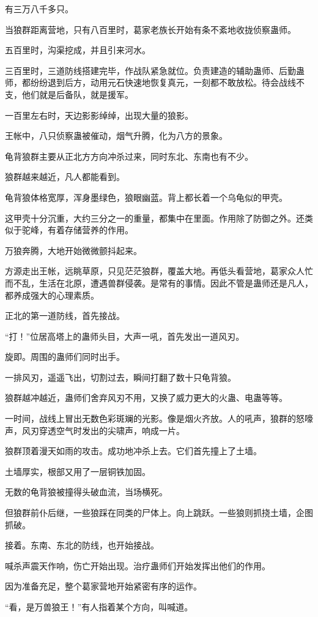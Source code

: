 \begin{this_body}
有三万八千多只。

当狼群距离营地，只有八百里时，葛家老族长开始有条不紊地收拢侦察蛊师。

五百里时，沟渠挖成，并且引来河水。

三百里时，三道防线搭建完毕，作战队紧急就位。负责建造的辅助蛊师、后勤蛊师，都纷纷退到后方，动用元石快速地恢复真元，一刻都不敢放松。待会战线不支，他们就是后备队，就是援军。

一百里左右时，天边影影绰绰，出现大量的狼影。

王帐中，八只侦察蛊被催动，烟气升腾，化为八方的景象。

龟背狼群主要从正北方方向冲杀过来，同时东北、东南也有不少。

狼群越来越近，凡人都能看到。

龟背狼体格宽厚，浑身墨绿色，狼眼幽蓝。背上都长着一个乌龟似的甲壳。

这甲壳十分沉重，大约三分之一的重量，都集中在里面。作用除了防御之外。还类似于驼峰，有着存储营养的作用。

万狼奔腾，大地开始微微颤抖起来。

方源走出王帐，远眺草原，只见茫茫狼群，覆盖大地。再低头看营地，葛家众人忙而不乱，生活在北原，遭遇兽群侵袭。是常有的事情。因此不管是蛊师还是凡人，都养成强大的心理素质。

正北的第一道防线，首先接战。

“打！”位居高塔上的蛊师头目，大声一吼，首先发出一道风刃。

旋即。周围的蛊师们同时出手。

一排风刃，遥遥飞出，切割过去，瞬间打翻了数十只龟背狼。

狼群越冲越近，蛊师们舍弃风刃不用，又换了威力更大的火蛊、电蛊等等。

一时间，战线上冒出无数色彩斑斓的光影。像是烟火齐放。人的吼声，狼群的怒嚎声，风刃穿透空气时发出的尖啸声，响成一片。

狼群顶着漫天如雨的攻击。成功地冲杀上去。它们首先撞上了土墙。

土墙厚实，根部又用了一层铜铁加固。

无数的龟背狼被撞得头破血流，当场横死。

但狼群前仆后继，一些狼踩在同类的尸体上。向上跳跃。一些狼则抓挠土墙，企图抓破。

接着。东南、东北的防线，也开始接战。

喊杀声震天作响，伤亡开始出现。治疗蛊师们开始发挥出他们的作用。

因为准备充足，整个葛家营地开始紧密有序的运作。

“看，是万兽狼王！”有人指着某个方向，叫喊道。


\end{this_body}
